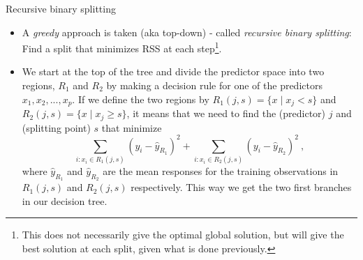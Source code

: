 \documentclass[10pt,ignorenonframetext,]{beamer}
\providecommand{\tightlist}{%
  \setlength{\itemsep}{0pt}\setlength{\parskip}{0pt}}
\begin{document}
\begin{frame}

\begin{block}{Recursive binary splitting}

\vspace{2mm}

\begin{itemize}
\tightlist
\item
  A \emph{greedy} approach is taken (aka top-down) - called
  \emph{recursive binary splitting}: Find a split that minimizes RSS at
  each
  step\footnote{This does not necessarily give the optimal global solution, but will give the best solution at each split, given what is done previously.}.
\end{itemize}

\vspace{1mm}

\begin{itemize}
\tightlist
\item
  We start at the top of the tree and divide the predictor space into
  two regions, \(R_1\) and \(R_2\) by making a decision rule for one of
  the predictors \(x_1, x_2,...,x_p\). If we define the two regions by
  \(R_1(j,s)=\{x \mid x_j<s\}\) and \(R_2(j,s)=\{x \mid x_j\geq s\}\),
  it means that we need to find the (predictor) \(j\) and (splitting
  point) \(s\) that minimize
  \[\sum_{i: x_i \in R_1(j,s)}(y_i-\hat{y}_{R_1})^2+\sum_{i: x_i \in R_2(j,s)}(y_i -\hat{y}_{R_2})^2 \ ,\]
  where \(\hat{y}_{R_1}\) and \(\hat{y}_{R_2}\) are the mean responses
  for the training observations in \(R_1(j,s)\) and \(R_2(j,s)\)
  respectively. This way we get the two first branches in our decision
  tree.
\end{itemize}

\end{block}

\end{frame}
\end{document}
